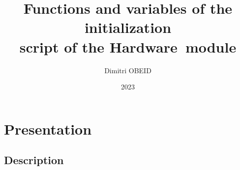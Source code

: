 \documentclass[a4paper,10pt]{article}
\title{\color{sec1}Functions and variables of the initialization \\script of the \color{sec2}Hardware\color{sec1}\ module}\color{text}
\author{Dimitri OBEID}
\date{2023}
\begin{document}
    \maketitle
    \newpage

    \hypertarget{contents}{}
    \tableofcontents
    \newpage

    \color{sec1}
    \section{Presentation}\color{text}

    \color{sec2}
    \subsection{Description}\color{text}
\end{document}
